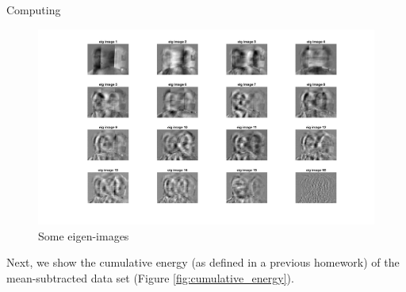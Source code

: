 \begin{section}{Computing}
{    \begin{minipage}{1.0\textwidth}
        \begin{figure}[H]
        \centering
        \includegraphics[trim={0cm 0cm 0cm 2cm},clip,width=0.85\columnwidth]{../data/eig_images}
        \setlength{\abovecaptionskip}{-20pt}
        \caption{Some eigen-images}
        \label{fig:eig_images}
        \end{figure}
    \end{minipage}
    Next, we show the cumulative energy (as defined in a previous homework) of the mean-subtracted data set (Figure \ref{fig:cumulative_energy}). 
}


\end{section}

\newpage

